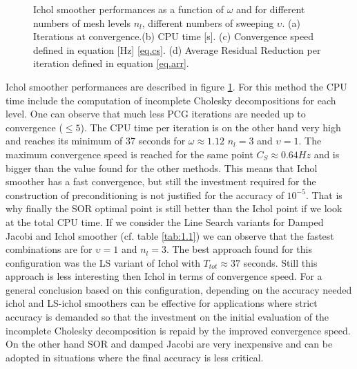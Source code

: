 \begin{figure}[hbt!]
{                                  }
                          \caption{Ichol smoother performances as a function of $\omega$ and for different numbers of mesh levels $n_l$, different numbers of sweeping $\upsilon$. (a) Iterations at convergence.(b) CPU time [s]. (c) Convergence speed defined in equation [Hz] \ref{eq.cs}. (d) Average Residual Reduction per iteration defined in equation \ref{eq.arr}. }
                          \label{f.1.34}
                        \end{figure}  
                        Ichol smoother performances are described in figure \ref{f.1.34}.  For this method the CPU time include the computation of incomplete Cholesky decompositions for each level. One can observe that much less PCG iterations are needed up to convergence ($\leq 5$). The CPU time per iteration is on the other hand very high and reaches its minimum of 37 seconds for $\omega\approx1.12$ $n_l=3$ and $\upsilon=1$. The maximum convergence speed is reached for the same point $C_S\approx 0.64 Hz$ and is bigger than the value found for the other methods. This means that Ichol smoother has a fast convergence, but still the investment required for the construction of preconditioning is not justified for the accuracy of $10^{-5}$. That is why finally the SOR optimal point is still better than the Ichol point if we look at the total CPU time. If we consider the Line Search variants for Damped Jacobi and Ichol smoother (cf. table \ref{tab:1.1}) we can observe that the fastest combinations are for $\upsilon=1$ and $n_l=3$. The best approach found for this configuration was the LS variant of Ichol with $T_{tot}\approx 37$ seconds. Still this approach is less interesting then Ichol in terms of convergence speed. For a general conclusion based on this configuration, depending on the accuracy needed ichol and LS-ichol smoothers can be effective for applications where strict accuracy is demanded so that the investment on the initial evaluation of the incomplete Cholesky decomposition is repaid by the improved convergence speed. On the other hand SOR and damped Jacobi are very inexpensive and can be adopted in situations where the final accuracy is less critical. 
